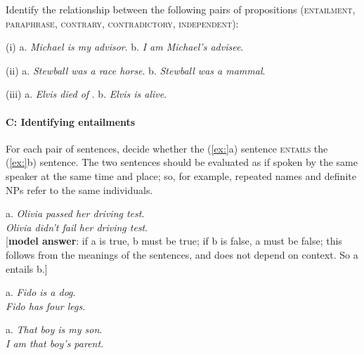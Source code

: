 Identify the relationship between the following pairs of propositions (\textsc{entailment, paraphrase, contrary,} \textsc{contradictory,} \textsc{independent}):

\begin{stylepoints}
(i)  a. \textit{Michael is my advisor}.  b. \textit{I am Michael’s advisee}.
\end{stylepoints}

\begin{stylepoints}
(ii)  a. \textit{Stewball was a race horse}.  b. \textit{Stewball was a mammal}.
\end{stylepoints}

\begin{stylepoints}
(iii)  a. \textit{Elvis died of} .  b. \textit{Elvis is alive}.
\end{stylepoints}

\paragraph{C: Identifying entailments}

For each pair of sentences, decide whether the (\ref{ex:}a) sentence \textsc{entails} the (\ref{ex:}b) sentence. The two sentences should be evaluated as if spoken by the same speaker at the same time and place; so, for example, repeated names and definite NPs refer to the same individuals.

\begin{stylepoints}
\ea%
    \label{ex:key:1}




          a. \textit{Olivia passed her driving test}.\\
\ex \textit{Olivia didn’t fail her driving test}.\\
{}[\textbf{model answer}: if a is true, b must be true; if b is false, a must be false; this follows from the meanings of the sentences, and does not depend on context. So a entails b.]
    \z
\end{stylepoints}

\begin{stylepoints}
\ea%
    \label{ex:key:2}




          a. \textit{Fido is a dog}.\\
\ex \textit{Fido has four legs}.
    \z
\end{stylepoints}

\begin{stylepoints}
\ea%
    \label{ex:key:3}




          a. \textit{That boy is my son}.\\
\ex \textit{I am that boy’s parent}.
    \z
\end{stylepoints}

